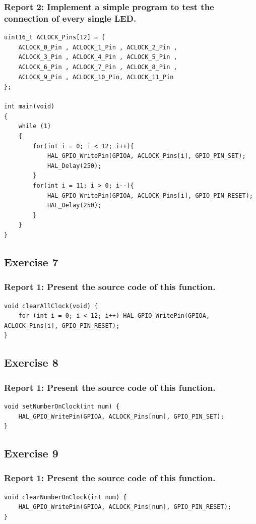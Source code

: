 \documentclass[a4paper,12pt]{article}
\begin{document}
\subsubsection{Report 2: Implement a simple program to test the connection of every single LED. }
\begin{lstlisting}
uint16_t ACLOCK_Pins[12] = {
	ACLOCK_0_Pin , ACLOCK_1_Pin , ACLOCK_2_Pin ,
	ACLOCK_3_Pin , ACLOCK_4_Pin , ACLOCK_5_Pin ,
	ACLOCK_6_Pin , ACLOCK_7_Pin , ACLOCK_8_Pin ,
	ACLOCK_9_Pin , ACLOCK_10_Pin, ACLOCK_11_Pin
};

int main(void)
{
	while (1)
	{
		for(int i = 0; i < 12; i++){
			HAL_GPIO_WritePin(GPIOA, ACLOCK_Pins[i], GPIO_PIN_SET);
			HAL_Delay(250);
		}
		for(int i = 11; i > 0; i--){
			HAL_GPIO_WritePin(GPIOA, ACLOCK_Pins[i], GPIO_PIN_RESET);
			HAL_Delay(250);
		}
	}
}
\end{lstlisting}
\newpage
\subsection{Exercise 7}
\subsubsection{Report 1: Present the source code of this function.}
\begin{lstlisting}
void clearAllClock(void) {
	for (int i = 0; i < 12; i++) HAL_GPIO_WritePin(GPIOA, ACLOCK_Pins[i], GPIO_PIN_RESET);
}
\end{lstlisting}
\subsection{Exercise 8}
\subsubsection{Report 1: Present the source code of this function.}
\begin{lstlisting}
void setNumberOnClock(int num) {
	HAL_GPIO_WritePin(GPIOA, ACLOCK_Pins[num], GPIO_PIN_SET);
}
\end{lstlisting}
\subsection{Exercise 9}
\subsubsection{Report 1: Present the source code of this function.}
\begin{lstlisting}
void clearNumberOnClock(int num) {
	HAL_GPIO_WritePin(GPIOA, ACLOCK_Pins[num], GPIO_PIN_RESET);
}
\end{lstlisting}
\end{document}
